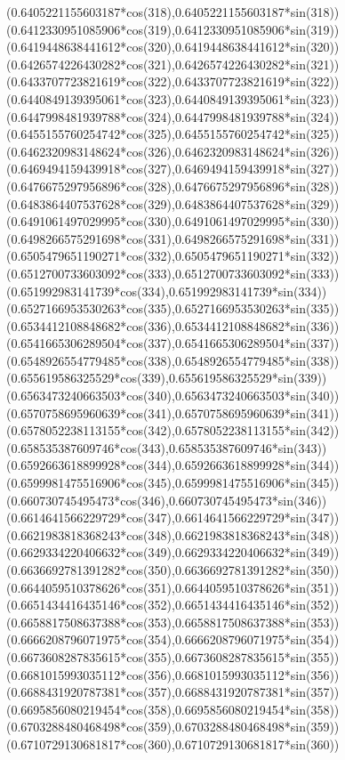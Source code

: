 {({0.6405221155603187*cos(318)},{0.6405221155603187*sin(318)})
({0.6412330951085906*cos(319)},{0.6412330951085906*sin(319)})
({0.6419448638441612*cos(320)},{0.6419448638441612*sin(320)})
({0.6426574226430282*cos(321)},{0.6426574226430282*sin(321)})
({0.6433707723821619*cos(322)},{0.6433707723821619*sin(322)})
({0.6440849139395061*cos(323)},{0.6440849139395061*sin(323)})
({0.6447998481939788*cos(324)},{0.6447998481939788*sin(324)})
({0.6455155760254742*cos(325)},{0.6455155760254742*sin(325)})
({0.6462320983148624*cos(326)},{0.6462320983148624*sin(326)})
({0.6469494159439918*cos(327)},{0.6469494159439918*sin(327)})
({0.6476675297956896*cos(328)},{0.6476675297956896*sin(328)})
({0.6483864407537628*cos(329)},{0.6483864407537628*sin(329)})
({0.6491061497029995*cos(330)},{0.6491061497029995*sin(330)})
({0.6498266575291698*cos(331)},{0.6498266575291698*sin(331)})
({0.6505479651190271*cos(332)},{0.6505479651190271*sin(332)})
({0.6512700733603092*cos(333)},{0.6512700733603092*sin(333)})
({0.651992983141739*cos(334)},{0.651992983141739*sin(334)})
({0.6527166953530263*cos(335)},{0.6527166953530263*sin(335)})
({0.6534412108848682*cos(336)},{0.6534412108848682*sin(336)})
({0.6541665306289504*cos(337)},{0.6541665306289504*sin(337)})
({0.6548926554779485*cos(338)},{0.6548926554779485*sin(338)})
({0.655619586325529*cos(339)},{0.655619586325529*sin(339)})
({0.6563473240663503*cos(340)},{0.6563473240663503*sin(340)})
({0.6570758695960639*cos(341)},{0.6570758695960639*sin(341)})
({0.6578052238113155*cos(342)},{0.6578052238113155*sin(342)})
({0.658535387609746*cos(343)},{0.658535387609746*sin(343)})
({0.6592663618899928*cos(344)},{0.6592663618899928*sin(344)})
({0.6599981475516906*cos(345)},{0.6599981475516906*sin(345)})
({0.660730745495473*cos(346)},{0.660730745495473*sin(346)})
({0.6614641566229729*cos(347)},{0.6614641566229729*sin(347)})
({0.6621983818368243*cos(348)},{0.6621983818368243*sin(348)})
({0.6629334220406632*cos(349)},{0.6629334220406632*sin(349)})
({0.6636692781391282*cos(350)},{0.6636692781391282*sin(350)})
({0.6644059510378626*cos(351)},{0.6644059510378626*sin(351)})
({0.6651434416435146*cos(352)},{0.6651434416435146*sin(352)})
({0.6658817508637388*cos(353)},{0.6658817508637388*sin(353)})
({0.6666208796071975*cos(354)},{0.6666208796071975*sin(354)})
({0.6673608287835615*cos(355)},{0.6673608287835615*sin(355)})
({0.6681015993035112*cos(356)},{0.6681015993035112*sin(356)})
({0.6688431920787381*cos(357)},{0.6688431920787381*sin(357)})
({0.6695856080219454*cos(358)},{0.6695856080219454*sin(358)})
({0.6703288480468498*cos(359)},{0.6703288480468498*sin(359)})
({0.6710729130681817*cos(360)},{0.6710729130681817*sin(360)})
}
